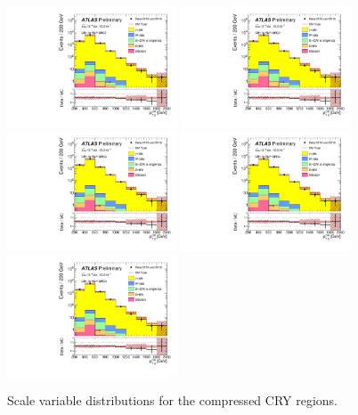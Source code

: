 \begin{figure}[tbph]
\begin{center}
\includegraphics[width=0.45\textwidth]{figures/ATLAS-CONF-2016-078_INT/N-1Plots/AtlasStyle/Preliminary/CRY_SRJigsawSRC1_LastCut_CRY_minusone}
\includegraphics[width=0.45\textwidth]{figures/ATLAS-CONF-2016-078_INT/N-1Plots/AtlasStyle/Preliminary/CRY_SRJigsawSRC2_LastCut_CRY_minusone}
\includegraphics[width=0.45\textwidth]{figures/ATLAS-CONF-2016-078_INT/N-1Plots/AtlasStyle/Preliminary/CRY_SRJigsawSRC3_LastCut_CRY_minusone}
\includegraphics[width=0.45\textwidth]{figures/ATLAS-CONF-2016-078_INT/N-1Plots/AtlasStyle/Preliminary/CRY_SRJigsawSRC4_LastCut_CRY_minusone}
\includegraphics[width=0.45\textwidth]{figures/ATLAS-CONF-2016-078_INT/N-1Plots/AtlasStyle/Preliminary/CRY_SRJigsawSRC5_LastCut_CRY_minusone}
\end{center}
\caption{Scale variable distributions for the compressed CRY regions.}
\label{fig:CRY_SRJigsawSRC1_LastCut_CRY_minusone}
\end{figure}

